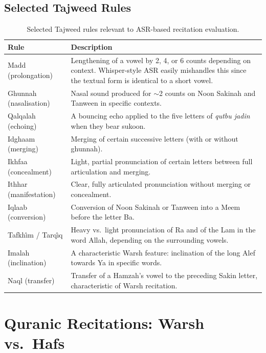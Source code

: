 \documentclass[12pt,a4paper]{report}
\begin{document}
\subsection{Selected Tajweed Rules}

\begin{table}[H]
  \centering
  \caption{Selected Tajweed rules relevant to ASR-based recitation
  evaluation.}
  \label{tab:mt_tajweed_rules}
  \renewcommand{\arraystretch}{1.3}
  \begin{tabular}{lp{9.5cm}}
    \toprule
    \textbf{Rule} & \textbf{Description} \\
    \midrule
    Madd (prolongation) & Lengthening of a vowel by 2, 4, or 6 counts
    depending on context. Whisper-style ASR easily mishandles this since
    the textual form is identical to a short vowel. \\
    Ghunnah (nasalisation) & Nasal sound produced for $\sim$2 counts on
    Noon Sakinah and Tanween in specific contexts. \\
    Qalqalah (echoing) & A bouncing echo applied to the five letters of
    \textit{qutbu jadin} when they bear sukoon. \\
    Idghaam (merging) & Merging of certain successive letters (with or
    without ghunnah). \\
    Ikhfaa (concealment) & Light, partial pronunciation of certain
    letters between full articulation and merging. \\
    Ithhar (manifestation) & Clear, fully articulated pronunciation
    without merging or concealment. \\
    Iqlaab (conversion) & Conversion of Noon Sakinah or Tanween into a
    Meem before the letter Ba. \\
    Tafkh{\^\i}m / Tarq{\^\i}q & Heavy vs.\ light pronunciation of Ra and
    of the Lam in the word Allah, depending on the surrounding vowels. \\
    Imalah (inclination) & A characteristic Warsh feature: inclination of
    the long Alef towards Ya in specific words. \\
    Naql (transfer) & Transfer of a Hamzah's vowel to the preceding
    Sakin letter, characteristic of Warsh recitation. \\
    \bottomrule
  \end{tabular}
\end{table}

\section{Quranic Recitations: Warsh vs.\ Hafs}
\label{sec:mt_warsh_vs_hafs}
\end{document}
